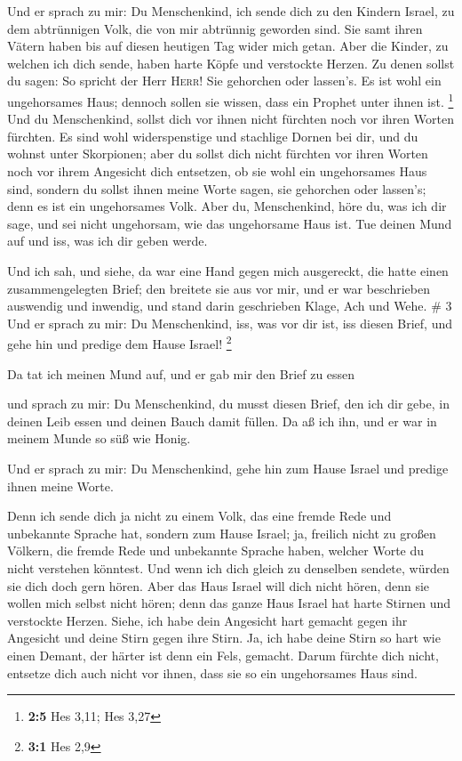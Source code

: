  Und er sprach zu mir: Du Menschenkind, ich sende dich zu
den Kindern Israel, zu dem abtrünnigen Volk, die von mir abtrünnig
geworden sind. Sie samt ihren Vätern haben bis auf diesen heutigen Tag
wider mich getan.  Aber die Kinder, zu welchen ich dich
sende, haben harte Köpfe und verstockte Herzen. Zu denen sollst du
sagen: So spricht der Herr \textsc{Herr}!  Sie gehorchen
oder lassen's. Es ist wohl ein ungehorsames Haus; dennoch sollen sie
wissen, dass ein Prophet unter ihnen ist. \footnote{\textbf{2:5} Hes
  3,11; Hes 3,27}  Und du Menschenkind, sollst dich vor
ihnen nicht fürchten noch vor ihren Worten fürchten. Es sind wohl
widerspenstige und stachlige Dornen bei dir, und du wohnst unter
Skorpionen; aber du sollst dich nicht fürchten vor ihren Worten noch vor
ihrem Angesicht dich entsetzen, ob sie wohl ein ungehorsames Haus sind,
 sondern du sollst ihnen meine Worte sagen, sie gehorchen
oder lassen's; denn es ist ein ungehorsames Volk.  Aber
du, Menschenkind, höre du, was ich dir sage, und sei nicht ungehorsam,
wie das ungehorsame Haus ist. Tue deinen Mund auf und iss, was ich dir
geben werde.

 Und ich sah, und siehe, da war eine Hand gegen mich
ausgereckt, die hatte einen zusammengelegten Brief;  den
breitete sie aus vor mir, und er war beschrieben auswendig und inwendig,
und stand darin geschrieben Klage, Ach und Wehe. \# 3  Und
er sprach zu mir: Du Menschenkind, iss, was vor dir ist, iss diesen
Brief, und gehe hin und predige dem Hause Israel! \footnote{\textbf{3:1}
  Hes 2,9}

 Da tat ich meinen Mund auf, und er gab mir den Brief zu
essen

 und sprach zu mir: Du Menschenkind, du musst diesen
Brief, den ich dir gebe, in deinen Leib essen und deinen Bauch damit
füllen. Da aß ich ihn, und er war in meinem Munde so süß wie Honig.

 Und er sprach zu mir: Du Menschenkind, gehe hin zum Hause
Israel und predige ihnen meine Worte.

 Denn ich sende dich ja nicht zu einem Volk, das eine
fremde Rede und unbekannte Sprache hat, sondern zum Hause Israel;
 ja, freilich nicht zu großen Völkern, die fremde Rede und
unbekannte Sprache haben, welcher Worte du nicht verstehen könntest. Und
wenn ich dich gleich zu denselben sendete, würden sie dich doch gern
hören.  Aber das Haus Israel will dich nicht hören, denn
sie wollen mich selbst nicht hören; denn das ganze Haus Israel hat harte
Stirnen und verstockte Herzen.  Siehe, ich habe dein
Angesicht hart gemacht gegen ihr Angesicht und deine Stirn gegen ihre
Stirn.  Ja, ich habe deine Stirn so hart wie einen Demant,
der härter ist denn ein Fels, gemacht. Darum fürchte dich nicht,
entsetze dich auch nicht vor ihnen, dass sie so ein ungehorsames Haus
sind.

